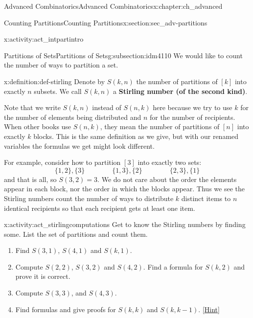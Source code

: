 \documentclass[oneside,10pt,]{book}
\newcommand{\terminology}[1]{\textbf{#1}}
\numberwithin{equation}{chapter}
\begin{document}
\begin{chapterptx}{Advanced Combinatorics}{}{Advanced Combinatorics}{}{}{x:chapter:ch_advanced}
\begin{sectionptx}{Counting Partitions}{}{Counting Partitions}{}{}{x:section:sec_adv-partitions}
\begin{introduction}{}
\begin{activity}{}{x:activity:act_intpartintro}
\begin{enumerate}[font=\bfseries,label=(\alph*),ref=\alph*]
\end{enumerate}
\end{activity}
\end{introduction}%
%
%
\typeout{************************************************}
\typeout{************************************************}
%
\begin{subsectionptx}{Partitions of Sets}{}{Partitions of Sets}{}{}{g:subsection:idm4110}
We would like to count the number of ways to partition a set.%
\begin{definition}{}{x:definition:def-stirling}%
Denote by \(S(k,n)\) the number of partitions of \([k]\) into exactly \(n\) subsets.  We call \(S(k,n)\) a \terminology{Stirling number (of the second kind)}.%
\end{definition}
Note that we write \(S(k,n)\) instead of \(S(n,k)\) here because we try to use \(k\) for the number of elements being distributed and \(n\) for the number of recipients.  When other books use \(S(n,k)\), they mean the number of partitions of \([n]\) into exactly \(k\) blocks.  This is the same definition as we give, but with our renamed variables the formulas we get might look different.%
\par
For example, consider how to partition \([3]\) into exactly two sets:%
\begin{equation*}
\{1,2\}, \{3\} \qquad \qquad \{1,3\},\{2\} \qquad \qquad \{2,3\},\{1\}
\end{equation*}
and that is all, so \(S(3,2) = 3\).  We do not care about the order the elements appear in each block, nor the order in which the blocks appear.  Thus we see the Stirling numbers count the number of ways to distribute \(k\) distinct items to \(n\) identical recipients so that each recipient gets at least one item.%
\begin{activity}{}{x:activity:act_stirlingcomputations}%
Get to know the Stirling numbers by finding some.  List the set of partitions and count them.%
\begin{enumerate}[font=\bfseries,label=(\alph*),ref=\alph*]
\item{}Find \(S(3,1)\), \(S(4,1)\) and \(S(k,1)\).%
\item{}Compute \(S(2,2)\), \(S(3,2)\) and \(S(4,2)\).  Find a formula for \(S(k,2)\) and prove it is correct.%
\item{}Compute \(S(3,3)\), and \(S(4,3)\).%
\item{}Find formulas and give proofs for \(S(k,k)\) and \(S(k,k - 1)\).%
\space\hspace*{0pt}\hfill{\tiny\hyperlink{g:hint:idm4161-back}{[Hint]}}\end{enumerate}

\end{activity}
\end{subsectionptx}
\end{sectionptx}
\end{chapterptx}
\end{document}
